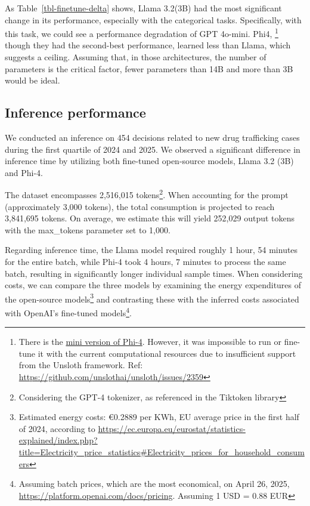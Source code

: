 \documentclass[
  12pt,
]{article}
\begin{document}
As Table~\ref{tbl-finetune-delta} shows, Llama 3.2(3B) had the most
significant change in its performance, especially with the categorical
tasks. Specifically, with this task, we could see a performance
degradation of GPT 4o-mini. Phi4, \footnote{There is the
  \href{https://huggingface.co/microsoft/Phi-4-mini-instruct}{mini
  version of Phi-4}. However, it was impossible to run or fine-tune it
  with the current computational resources due to insufficient support
  from the Unsloth framework. Ref:
  \url{https://github.com/unslothai/unsloth/issues/2359}} though they
had the second-best performance, learned less than Llama, which suggests
a ceiling. Assuming that, in those architectures, the number of
parameters is the critical factor, fewer parameters than 14B and more
than 3B would be ideal.

\subsection{Inference performance}\label{inference-performance}

We conducted an inference on 454 decisions related to new drug
trafficking cases during the first quartile of 2024 and 2025. We
observed a significant difference in inference time by utilizing both
fine-tuned open-source models, Llama 3.2 (3B) and Phi-4.

The dataset encompasses 2,516,015 tokens\footnote{Considering the GPT-4
  tokenizer, as referenced in the Tiktoken library}. When accounting for
the prompt (approximately 3,000 tokens), the total consumption is
projected to reach 3,841,695 tokens. On average, we estimate this will
yield 252,029 output tokens with the max\_tokens parameter set to 1,000.

Regarding inference time, the Llama model required roughly 1 hour, 54
minutes for the entire batch, while Phi-4 took 4 hours, 7 minutes to
process the same batch, resulting in significantly longer individual
sample times. When considering costs, we can compare the three models by
examining the energy expenditures of the open-source models\footnote{Estimated
  energy costs: €0.2889 per KWh, EU average price in the first half of
  2024, according to
  \url{https://ec.europa.eu/eurostat/statistics-explained/index.php?title=Electricity_price_statistics\#Electricity_prices_for_household_consumers}}
and contrasting these with the inferred costs associated with OpenAI's
fine-tuned models\footnote{Assuming batch prices, which are the most
  economical, on April 26, 2025,
  \url{https://platform.openai.com/docs/pricing}. Assuming 1 USD = 0.88
  EUR}.
\end{document}
